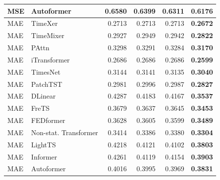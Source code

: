 \begin{longtable}{llrrrr}
MSE & Autoformer & 0.6580 & 0.6399 & 0.6311 & \textbf{0.6176} \\
\midrule
MAE & TimeXer & 0.2713 & 0.2713 & 0.2713 & \textbf{0.2672} \\
MAE & TimeMixer & 0.2927 & 0.2949 & 0.2942 & \textbf{0.2822} \\
MAE & PAttn & 0.3298 & 0.3291 & 0.3284 & \textbf{0.3170} \\
MAE & iTransformer & 0.2686 & 0.2686 & 0.2686 & \textbf{0.2599} \\
MAE & TimesNet & 0.3144 & 0.3141 & 0.3135 & \textbf{0.3040} \\
MAE & PatchTST & 0.2981 & 0.2996 & 0.2987 & \textbf{0.2827} \\
MAE & DLinear & 0.4287 & 0.4183 & 0.4167 & \textbf{0.3537} \\
MAE & FreTS & 0.3679 & 0.3637 & 0.3645 & \textbf{0.3453} \\
MAE & FEDformer & 0.3628 & 0.3605 & 0.3599 & \textbf{0.3489} \\
MAE & Non-stat. Transformer & 0.3414 & 0.3386 & 0.3380 & \textbf{0.3304} \\
MAE & LightTS & 0.4218 & 0.4121 & 0.4102 & \textbf{0.3803} \\
MAE & Informer & 0.4261 & 0.4119 & 0.4154 & \textbf{0.3903} \\
MAE & Autoformer & 0.4016 & 0.3995 & 0.3969 & \textbf{0.3831} \\
\end{longtable}
\endgroup

